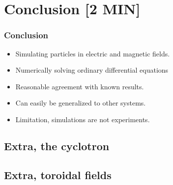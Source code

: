 \documentclass{beamer}
\begin{document}
\section{Conclusion [2 MIN]}


\begin{frame}
\frametitle{Conclusion }
\begin{itemize}
\item<1-> Simulating particles in electric and magnetic fields.
\item<2-> Numerically solving ordinary differential equations
\item<2-> Reasonable agreement with known results.
\item<2-> Can easily be generalized to other systems.
\item<3-> Limitation, simulations are not experiments.
\end{itemize}
\end{frame}


\subsection{Extra, the cyclotron}
\subsection{Extra, toroidal fields}
\end{document}
